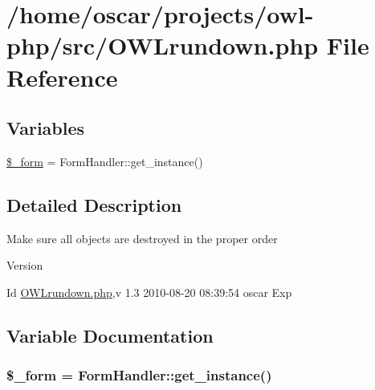 \section{/home/oscar/projects/owl-\/php/src/OWLrundown.php File Reference}
\label{OWLrundown_8php}
\subsection*{Variables}
\begin{DoxyCompactItemize}
\item 
\hyperlink{OWLrundown_8php_ab14b242803551e0f269742a7103f149d}{\$\_\-form} = FormHandler::get\_\-instance()
\end{DoxyCompactItemize}


\subsection{Detailed Description}
Make sure all objects are destroyed in the proper order \begin{DoxyVersion}{Version}

\end{DoxyVersion}
\begin{DoxyParagraph}{Id}
\hyperlink{OWLrundown_8php}{OWLrundown.php},v 1.3 2010-\/08-\/20 08:39:54 oscar Exp 
\end{DoxyParagraph}


\subsection{Variable Documentation}
\subsubsection[{\$\_\-form}]{\setlength{\rightskip}{0pt plus 5cm}\$\_\-form = FormHandler::get\_\-instance()}\label{OWLrundown_8php_ab14b242803551e0f269742a7103f149d}
